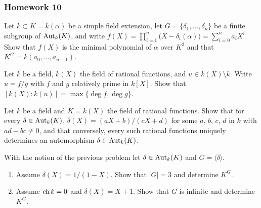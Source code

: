 \subsubsection{Homework 10}
\setcounter{exercise}{0}
\setcounter{equation}{0}

\begin{problem}
  Let \(k\subset K=k(\alpha)\) be a simple field extension, let
  \(G=\{\delta_1,\dotsc,\delta_n\}\) be a finite subgroup of \(\operatorname{Aut}_k(K)\),
  and write
  \(f(X)=\prod_{i=1}^n\bigl(X-\delta_i(\alpha)\bigr)=\sum_{i=0}^na_iX^i\). Show
  that \(f(X)\) is the minimal polynomial of \(\alpha\) over \(K^2\) and
  that \(K^G=k(a_0,\dotsc,a_{n-1})\).
\end{problem}
\begin{solution}
\end{solution}

\begin{problem}
  Let \(k\) be a field, \(k(X)\) the field of rational functions, and
  \(u\in k(X)\setminus k\). Write \(u= f/g\) with \(f\) and \(g\)
  relatively prime in \(k[X]\). Show that
  \([k(X):k(u)]=\max\{{\deg f},{\deg g}\}\).
\end{problem}
\begin{solution}
\end{solution}

\begin{problem}
  Let \(k\) be a field and \(K= k(X)\) the field of rational
  functions. Show that for every \(\delta\in\operatorname{Aut}_k(K)\),
  \(\delta(X)= (aX+b)/(cX+d)\) for some \(a\), \(b\), \(c\), \(d\) in \(k\)
  with \(ad-bc\neq 0\), and that conversely, every such rational functions
  uniquely determines an automorphism \(\delta\in\operatorname{Aut}_k(K)\).
\end{problem}
\begin{solution}
\end{solution}

\begin{problem}
  With the notion of the previous problem let \(\delta\in\operatorname{Aut}_k(K)\) and
  \(G=\langle \delta \rangle\).
  \begin{enumerate}[label=(\alph*)]
  \item Assume \(\delta(X)=1/(1-X)\). Show that \(|G|=3\) and determine
    \(K^G\).
  \item Assume \(\operatorname{ch} k=0\) and \(\delta(X)=X+1\). Show that \(G\) is
    infinite and determine \(K^G\).
  \end{enumerate}
\end{problem}
\begin{solution}
\end{solution}

